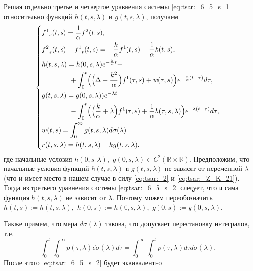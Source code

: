 Решая отдельно третье и четвертое уравнения системы \eqref{eq:tsar:_6_5_s_1} 
относительно функций $h(t,s,\lambda)$ и $g(t,s,\lambda)$, получаем 
\begin{equation}
\left\{
\begin{aligned}
&{f^1}_s(t,s) = \frac{1}{\alpha} {f^2}(t,s),\\
&{f^2}_s(t,s) - {f^1}_t(t,s) = - \frac{k}{\alpha} {f^1}(t,s)
			       - \frac{1}{\alpha} h(t,s)
,\\
&h (t,s,\lambda) = h(0,s,\lambda) e^{-\frac{k}{\alpha} t} + \\
& \qquad \qquad
				  + \int_0^t \Bigl( \Bigl( \Delta - \frac{k^2}{\alpha} \Bigr) {f^1}(\tau,s) + w(\tau,s) \Bigr) e^{ -\frac{k}{\alpha} (t - \tau)} d\tau
				  ,\\
&g(t,s,\lambda) = g(0,s,\lambda)) e^{-\lambda t} - \\
& \qquad \qquad
				- \int_0^t \Bigl( \Bigl( \frac{k}{\alpha} + \lambda \Bigr) {f^1}(\tau,s) + \frac{1}{\alpha} h(\tau,s,\lambda) \Bigr) e^{-\lambda (t - \tau)} d\tau
				,\\
&w(t,s) = \int_0^{\infty} g(t,s,\lambda) d\sigma(\lambda)
				  , \\
&r(t,s,\lambda) = h(t,s,\lambda) - k g(t,s,\lambda)
				,\\
\end{aligned}
\right. \label{eq:tsar:_6_5_s_2}
\end{equation}
где начальные условия $h(0,s,\lambda),$ $ g(0,s,\lambda) \in C^2({\mathbb R \times \mathbb R}).$ 
Предположим, что начальные условия функций 
$h(t,s,\lambda)$ и $g(t,s,\lambda)$ не зависят от переменной $\lambda$ 
(что и имеет место в нашем случае в силу \eqref{eq:tsar:_2} и \eqref{eq:tsar:_Z_K_21}). 
Тогда из третьего уравнения системы \eqref{eq:tsar:_6_5_s_2} следует, что 
и сама функция $h(t,s,\lambda)$ не зависит от $\lambda.$ 
Поэтому можем переобозначить $h(t,s) := h(t,s,\lambda),$ 
$h(0,s) := h(0,s,\lambda),$ $g(0,s) := g(0,s,\lambda).$ 

Также примем, что мера $d\sigma(\lambda)$ такова, что допускает перестановку интегралов, 
т.е. 
$$\int_0^t \int_0^{\infty} p(\tau,\lambda) d\sigma(\lambda) d \tau = \int_0^{\infty} \int_0^t p(\tau,\lambda) d\tau d\sigma(\lambda).$$
После этого \eqref{eq:tsar:_6_5_s_2} будет эквивалентно

